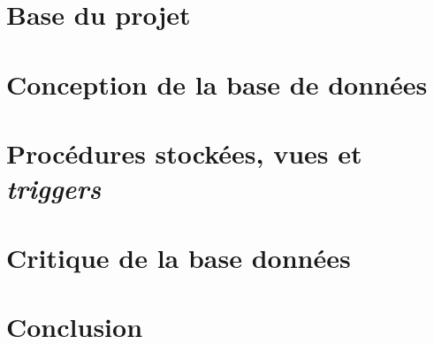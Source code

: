 \documentclass[a4paper,oneside]{article}
\begin{document}
\newpage

\section{Base du projet}
    
    
\section{Conception de la base de données}	
    
    
\section{Procédures stockées, vues et \textit{triggers}}
    

\section{Critique de la base données}
    

\newpage

\section*{Conclusion}
    

\newpage

\listoffigures
\end{document}
